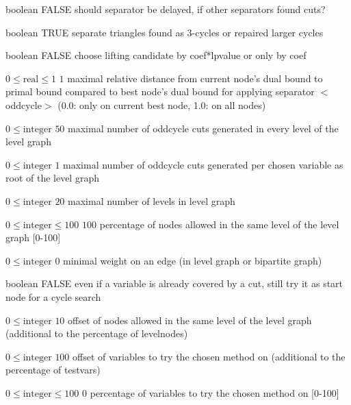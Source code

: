 %
{boolean}%
{FALSE}%
{should separator be delayed, if other separators found cuts?}%
{}

%
{boolean}%
{TRUE}%
{separate triangles found as 3-cycles or repaired larger cycles}%
{}

%
{boolean}%
{FALSE}%
{choose lifting candidate by coef*lpvalue or only by coef}%
{}

%
{$0\leq\textrm{real}\leq1$}%
{$1$}%
{maximal relative distance from current node's dual bound to primal bound compared to best node's dual bound for applying separator $<$oddcycle$>$ (0.0: only on current best node, 1.0: on all nodes)}%
{}

%
{$0\leq\textrm{integer}$}%
{$50$}%
{maximal number of oddcycle cuts generated in every level of the level graph}%
{}

%
{$0\leq\textrm{integer}$}%
{$1$}%
{maximal number of oddcycle cuts generated per chosen variable as root of the level graph}%
{}

%
{$0\leq\textrm{integer}$}%
{$20$}%
{maximal number of levels in level graph}%
{}

%
{$0\leq\textrm{integer}\leq100$}%
{$100$}%
{percentage of nodes allowed in the same level of the level graph [0-100]}%
{}

%
{$0\leq\textrm{integer}$}%
{$0$}%
{minimal weight on an edge (in level graph or bipartite graph)}%
{}

%
{boolean}%
{FALSE}%
{even if a variable is already covered by a cut, still try it as start node for a cycle search}%
{}

%
{$0\leq\textrm{integer}$}%
{$10$}%
{offset of nodes allowed in the same level of the level graph (additional to the percentage of levelnodes)}%
{}

%
{$0\leq\textrm{integer}$}%
{$100$}%
{offset of variables to try the chosen method on (additional to the percentage of testvars)}%
{}

%
{$0\leq\textrm{integer}\leq100$}%
{$0$}%
{percentage of variables to try the chosen method on [0-100]}%
{}

